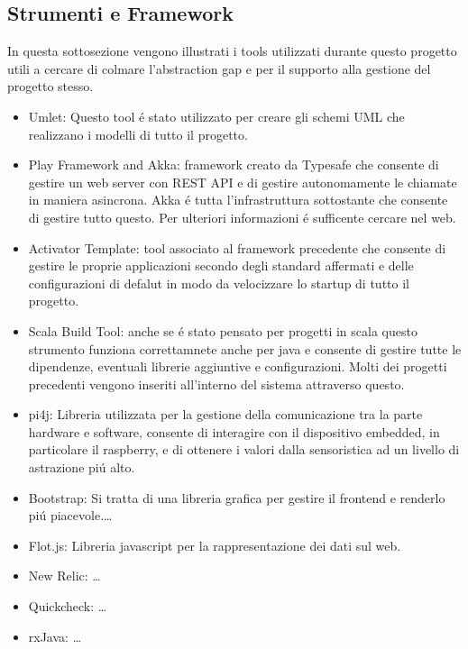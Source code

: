 \subsection{Strumenti e Framework}

In questa sottosezione vengono illustrati i tools utilizzati durante questo progetto utili a cercare di colmare l'abstraction gap e per il supporto alla gestione del progetto stesso.

\begin{itemize}
 \item{Umlet:} Questo tool \'e stato utilizzato per creare gli schemi UML che realizzano i modelli di tutto il progetto.\cite{Umlet}
 \item {Play Framework and Akka:} framework creato da Typesafe che consente di gestire un web server con REST API e di gestire autonomamente le chiamate in maniera asincrona. Akka \'e tutta l'infrastruttura sottostante che consente di gestire tutto questo. Per ulteriori informazioni \'e sufficente cercare nel web.\cite{Akka,PlayFramework}
 \item {Activator Template:} tool associato al framework precedente che consente di gestire le proprie applicazioni secondo degli standard affermati e delle configurazioni di defalut in modo da velocizzare lo startup di tutto il progetto.\cite{Activator&SBT}
 \item {Scala Build Tool:} anche se \'e stato pensato per progetti in scala questo strumento funziona correttamnete anche per java e consente di gestire tutte le dipendenze, eventuali librerie aggiuntive e configurazioni. Molti dei progetti precedenti vengono inseriti all'interno del sistema attraverso questo.\cite{Activator&SBT}
 \item {pi4j:} Libreria utilizzata per la gestione della comunicazione tra la parte hardware e software, consente di interagire con il dispositivo embedded, in particolare il raspberry, e di ottenere i valori dalla sensoristica ad un livello di astrazione pi\'u alto. \cite{Pi4J}
 \item {Bootstrap:} Si tratta di una libreria grafica per gestire il frontend e renderlo pi\'u piacevole.\ldots
 \item {Flot.js:} Libreria javascript per la rappresentazione dei dati sul web. \cite{FlotJS}
 \item {New Relic:} \ldots
 \item {Quickcheck:} \ldots
 \item {rxJava:} \ldots \cite{RxJava}
\end{itemize}
